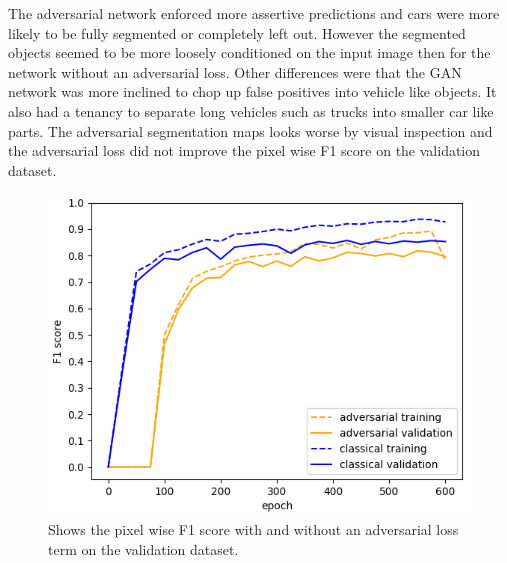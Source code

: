 \documentclass{kththesis}
\begin{document}
\noindent The adversarial network enforced more assertive predictions and cars were more likely to be fully segmented or completely left out. However the segmented objects seemed to be more loosely conditioned on the input image then for the network without an adversarial loss. Other differences were that the GAN network was more inclined to chop up false positives into vehicle like objects. It also had a tenancy to separate long vehicles such as trucks into smaller car like parts. The adversarial segmentation maps looks worse by visual inspection and the adversarial loss did not improve the pixel wise F1 score on the validation dataset.
\begin{figure}[H]
\centering
      \includegraphics[scale=0.5]{classical_vs_adversarial}
  \caption{Shows the pixel wise F1 score with and without an adversarial loss term on the validation dataset.} \label{fig:gan_vs_class}
\end{figure}
\end{document}
